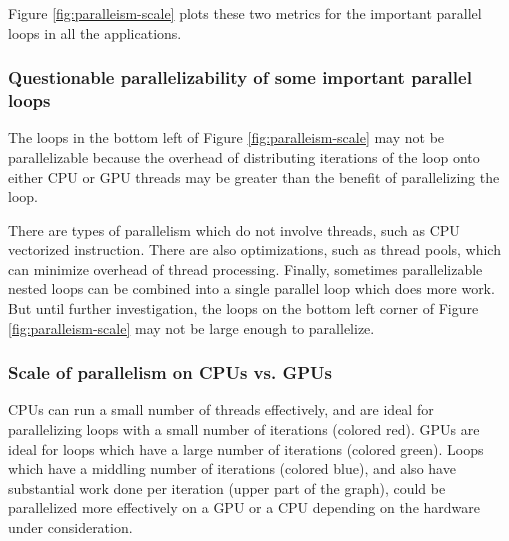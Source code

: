 \documentclass[12pt,twoside]{reedthesis}
\begin{document}
		Figure \ref{fig:paralleism-scale} plots these two metrics for the important parallel loops in all the applications. 
		
		\subsubsection{Questionable parallelizability of some important parallel loops}
		
		The loops in the bottom left of Figure \ref{fig:paralleism-scale} may not be parallelizable because the overhead of distributing iterations of the loop onto either CPU or GPU threads may be greater than the benefit of parallelizing the loop. 
		
		There are types of parallelism which do not involve threads, such as CPU vectorized instruction. There are also optimizations, such as thread pools, which can minimize overhead of thread processing. Finally, sometimes parallelizable nested loops can be combined into a single parallel loop which does more work. But until further investigation, the loops on the bottom left corner of Figure \ref{fig:paralleism-scale} may not be large enough to parallelize. 
		
		\subsubsection{Scale of parallelism on CPUs vs. GPUs}
		
		CPUs can run a small number of threads effectively, and are ideal for parallelizing loops with a small number of iterations (colored red).%
		GPUs are ideal for loops which have a large number of iterations (colored green).%
		Loops which have a middling number of iterations (colored blue), and also have substantial work done per iteration (upper part of the graph), could be parallelized more effectively on a GPU or a CPU depending on the hardware under consideration. %
		
		
\end{document}
